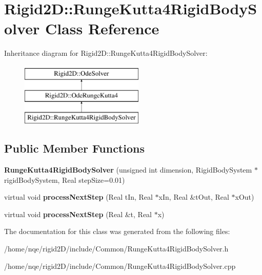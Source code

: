 \hypertarget{class_rigid2_d_1_1_runge_kutta4_rigid_body_solver}{
\section{Rigid2D::RungeKutta4RigidBodySolver Class Reference}
\label{class_rigid2_d_1_1_runge_kutta4_rigid_body_solver}
}
Inheritance diagram for Rigid2D::RungeKutta4RigidBodySolver:\begin{figure}[H]
\begin{center}
\leavevmode
\includegraphics[height=3cm]{class_rigid2_d_1_1_runge_kutta4_rigid_body_solver}
\end{center}
\end{figure}
\subsection*{Public Member Functions}
\begin{DoxyCompactItemize}
\item 
\hypertarget{class_rigid2_d_1_1_runge_kutta4_rigid_body_solver_a9bbb3c0159229e650f619d19f84f4d7e}{
{\bfseries RungeKutta4RigidBodySolver} (unsigned int dimension, RigidBodySystem $\ast$rigidBodySystem, Real stepSize=0.01)}
\label{class_rigid2_d_1_1_runge_kutta4_rigid_body_solver_a9bbb3c0159229e650f619d19f84f4d7e}

\item 
\hypertarget{class_rigid2_d_1_1_runge_kutta4_rigid_body_solver_a59ab8c75bc6bc12f4c8531ec84fcd36d}{
virtual void {\bfseries processNextStep} (Real tIn, Real $\ast$xIn, Real \&tOut, Real $\ast$xOut)}
\label{class_rigid2_d_1_1_runge_kutta4_rigid_body_solver_a59ab8c75bc6bc12f4c8531ec84fcd36d}

\item 
\hypertarget{class_rigid2_d_1_1_runge_kutta4_rigid_body_solver_a4e8b59cbf89418a850a2a8639fe1afaa}{
virtual void {\bfseries processNextStep} (Real \&t, Real $\ast$x)}
\label{class_rigid2_d_1_1_runge_kutta4_rigid_body_solver_a4e8b59cbf89418a850a2a8639fe1afaa}

\end{DoxyCompactItemize}


The documentation for this class was generated from the following files:\begin{DoxyCompactItemize}
\item 
/home/nqe/rigid2D/include/Common/RungeKutta4RigidBodySolver.h\item 
/home/nqe/rigid2D/include/Common/RungeKutta4RigidBodySolver.cpp\end{DoxyCompactItemize}
